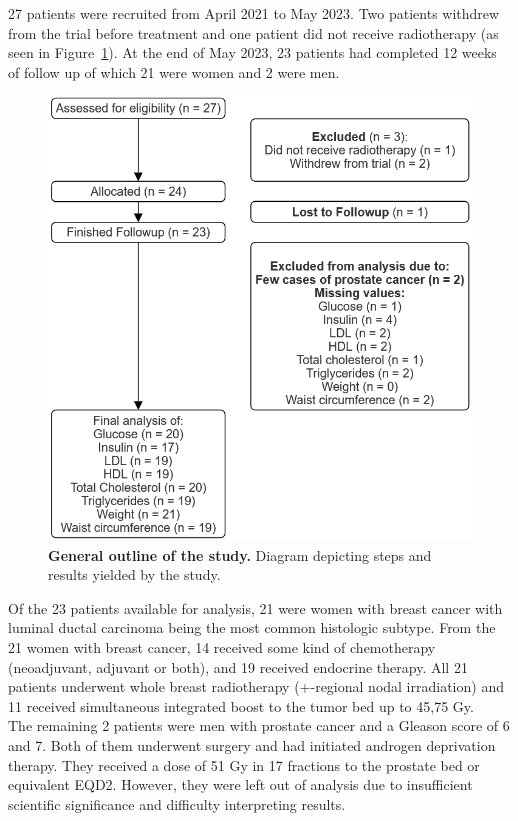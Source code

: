 \documentclass[journal,article,submit,pdftex,moreauthors]{Definitions/mdpi}
\begin{document}
27 patients were recruited from April 2021 to May 2023. Two patients withdrew from the trial before treatment and one patient did not receive radiotherapy (as seen in Figure~\ref{fig2}). At the end of May 2023, 23 patients had completed 12 weeks of follow up of which 21 were women and 2 were men. 

\begin{figure}[H]
\includegraphics[width=10.5 cm]{Figure2.png}
\caption{\textbf{General outline of the study.} Diagram depicting steps and results yielded by the study.\label{fig2}}
\end{figure}   


Of the 23 patients available for analysis, 21 were women with breast cancer with luminal ductal carcinoma being the most common histologic subtype. From the 21 women with breast cancer, 14 received some kind of chemotherapy (neoadjuvant, adjuvant or both), and 19 received endocrine therapy. All 21 patients underwent whole breast radiotherapy (+-regional nodal irradiation) and 11 received simultaneous integrated boost to the tumor bed up to 45,75 Gy.\\

The remaining 2 patients were men with prostate cancer and a Gleason score of 6 and 7. Both of them underwent surgery and had initiated androgen deprivation therapy. They received  a dose of 51 Gy in 17 fractions to the prostate bed or equivalent EQD2. {\color{blue}However, they were left out of analysis due to insufficient scientific significance and difficulty interpreting results.}\\
\end{document}
